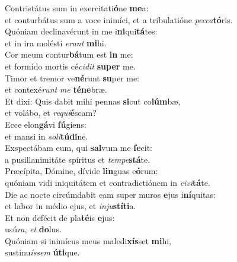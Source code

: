\evenverse Contristátus sum in exercitati\textbf{ó}ne \textbf{me}a:~\*\\
\evenverse et conturbátus sum a voce inimíci, et a tribulatióne \textit{pec}\textit{ca}\textbf{tó}ris.\\
\oddverse Quóniam declinavérunt in me i\textbf{ni}qui\textbf{tá}tes:~\*\\
\oddverse et in ira molésti \textit{e}\textit{rant} \textbf{mi}hi.\\
\evenverse Cor meum contur\textbf{bá}tum est \textbf{in} me:~\*\\
\evenverse et formído mortis cé\textit{ci}\textit{dit} \textbf{su}\textbf{per} me.\\
\oddverse Timor et tremor ve\textbf{né}runt \textbf{su}per me:~\*\\
\oddverse et contexé\textit{runt} \textit{me} \textbf{té}\textbf{ne}bræ.\\
\evenverse Et dixi: Quis dabit mihi pennas \textbf{si}cut co\textbf{lúm}bæ,~\*\\
\evenverse et volábo, et \textit{re}\textit{qui}\textbf{é}scam?\\
\oddverse Ecce elon\textbf{gá}vi \textbf{fú}giens:~\*\\
\oddverse et mansi in \textit{so}\textit{li}\textbf{tú}\textbf{di}ne.\\
\evenverse Exspectábam eum, qui \textbf{sal}vum me \textbf{fe}cit:~\*\\
\evenverse a pusillanimitáte spíritus et \textit{tem}\textit{pe}\textbf{stá}te.\\
\oddverse Præcípita, Dómine, dívide \textbf{lin}guas e\textbf{ó}rum:~\*\\
\oddverse quóniam vidi iniquitátem et contradictiónem in \textit{ci}\textit{vi}\textbf{tá}te.\\
\evenverse Die ac nocte circúmdabit eam super muros \textbf{e}jus i\textbf{ní}quitas:~\*\\
\evenverse et labor in médio ejus, et \textit{in}\textit{ju}\textbf{stí}\textbf{ti}a.\\
\oddverse Et non defécit de pla\textbf{té}is \textbf{e}jus:~\*\\
\oddverse usú\textit{ra}, \textit{et} \textbf{do}lus.\\
\evenverse Quóniam si inimícus meus maledi\textbf{xís}set \textbf{mi}hi,~\*\\
\evenverse sustinu\textit{ís}\textit{sem} \textbf{ú}\textbf{ti}que.\\

